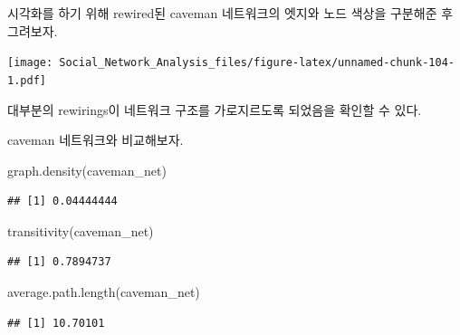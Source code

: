 \documentclass[
]{book}
\newenvironment{Shaded}{\begin{snugshade}}{\end{snugshade}}
\newcommand{\AttributeTok}[1]{\textcolor[rgb]{0.77,0.63,0.00}{#1}}
\newcommand{\ConstantTok}[1]{\textcolor[rgb]{0.00,0.00,0.00}{#1}}
\newcommand{\DecValTok}[1]{\textcolor[rgb]{0.00,0.00,0.81}{#1}}
\newcommand{\FunctionTok}[1]{\textcolor[rgb]{0.00,0.00,0.00}{#1}}
\newcommand{\NormalTok}[1]{#1}
\newcommand{\OtherTok}[1]{\textcolor[rgb]{0.56,0.35,0.01}{#1}}
\newcommand{\SpecialCharTok}[1]{\textcolor[rgb]{0.00,0.00,0.00}{#1}}
\newcommand{\StringTok}[1]{\textcolor[rgb]{0.31,0.60,0.02}{#1}}
\begin{document}
시각화를 하기 위해 rewired된 caveman 네트워크의 엣지와 노드 색상을 구분해준 후 그려보자.

\begin{Shaded}
\end{Shaded}

\texttt{[image: Social\_Network\_Analysis\_files/figure-latex/unnamed-chunk-104-1.pdf]}

대부분의 rewirings이 네트워크 구조를 가로지르도록 되었음을 확인할 수 있다.

caveman 네트워크와 비교해보자.

\begin{Shaded}
\begin{Highlighting}[]
\FunctionTok{graph.density}\NormalTok{(caveman\_net) }
\end{Highlighting}
\end{Shaded}

\begin{verbatim}
## [1] 0.04444444
\end{verbatim}

\begin{Shaded}
\begin{Highlighting}[]
\FunctionTok{transitivity}\NormalTok{(caveman\_net) }
\end{Highlighting}
\end{Shaded}

\begin{verbatim}
## [1] 0.7894737
\end{verbatim}

\begin{Shaded}
\begin{Highlighting}[]
\FunctionTok{average.path.length}\NormalTok{(caveman\_net)}
\end{Highlighting}
\end{Shaded}

\begin{verbatim}
## [1] 10.70101
\end{verbatim}
\end{document}

